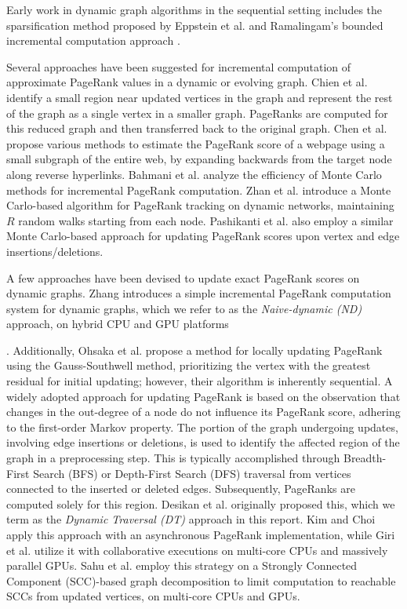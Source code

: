 Early work in dynamic graph algorithms in the sequential setting includes the sparsification method proposed by Eppstein et al. \cite{graph-eppstein97} and Ramalingam's bounded incremental computation approach \cite{incr-ramalingam96}. Several approaches have been suggested for incremental computation of approximate PageRank values in a dynamic or evolving graph. Chien et al. \cite{rank-chien01} identify a small region near updated vertices in the graph and represent the rest of the graph as a single vertex in a smaller graph. PageRanks are computed for this reduced graph and then transferred back to the original graph. Chen et al. \cite{chen2004local} propose various methods to estimate the PageRank score of a webpage using a small subgraph of the entire web, by expanding backwards from the target node along reverse hyperlinks. Bahmani et al. \cite{bahmani2010fast} analyze the efficiency of Monte Carlo methods for incremental PageRank computation. Zhan et al. \cite{zhan2019fast} introduce a Monte Carlo-based algorithm for PageRank tracking on dynamic networks, maintaining $R$ random walks starting from each node. Pashikanti et al. \cite{rank-pashikanti22} also employ a similar Monte Carlo-based approach for updating PageRank scores upon vertex and edge insertions/deletions.

A few approaches have been devised to update exact PageRank scores on dynamic graphs. Zhang \cite{rank-zhang17} introduces a simple incremental PageRank computation system for dynamic graphs, which we refer to as the \textit{Naive-dynamic (ND)} approach, on hybrid CPU and GPU platforms. Additionally, Ohsaka et al. \cite{ohsaka2015efficient} propose a method for locally updating PageRank using the Gauss-Southwell method, prioritizing the vertex with the greatest residual for initial updating; however, their algorithm is inherently sequential. A widely adopted approach for updating PageRank \cite{rank-desikan05, kim2015incremental, rank-giri20, sahu2022dynamic} is based on the observation that changes in the out-degree of a node do not influence its PageRank score, adhering to the first-order Markov property. The portion of the graph undergoing updates, involving edge insertions or deletions, is used to identify the affected region of the graph in a preprocessing step. This is typically accomplished through Breadth-First Search (BFS) or Depth-First Search (DFS) traversal from vertices connected to the inserted or deleted edges. Subsequently, PageRanks are computed solely for this region. Desikan et al. \cite{rank-desikan05} originally proposed this, which we term as the \textit{Dynamic Traversal (DT)} approach in this report. Kim and Choi \cite{kim2015incremental} apply this approach with an asynchronous PageRank implementation, while Giri et al. \cite{rank-giri20} utilize it with collaborative executions on multi-core CPUs and massively parallel GPUs. Sahu et al. \cite{sahu2022dynamic} employ this strategy on a Strongly Connected Component (SCC)-based graph decomposition to limit computation to reachable SCCs from updated vertices, on multi-core CPUs and GPUs.

